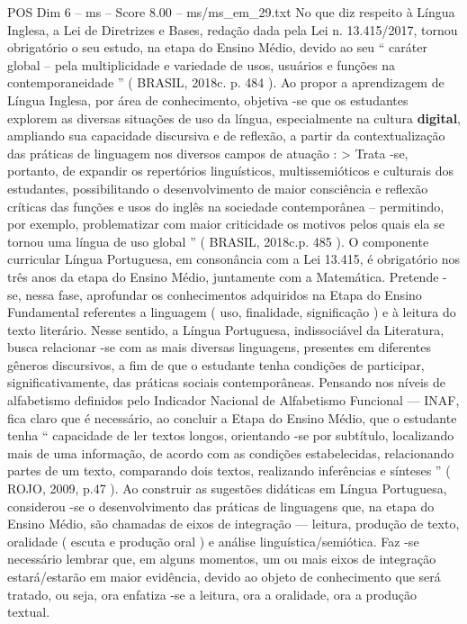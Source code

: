 \begin{textsample}{POS Dim 6 – ms – Score 8.00 – ms/ms\_em\_29.txt}
No que diz respeito à Língua Inglesa, a Lei de Diretrizes e Bases, redação dada pela Lei n. 13.415/2017, tornou obrigatório o seu estudo, na etapa do Ensino Médio, devido ao seu “ caráter global – pela multiplicidade e variedade de usos, usuários e funções na contemporaneidade ” ( BRASIL, 2018c. p. 484 ).
Ao propor a aprendizagem de Língua Inglesa, por área de conhecimento, objetiva -se que os estudantes explorem as diversas situações de uso da língua, especialmente na cultura \textbf{digital}, ampliando sua capacidade discursiva e de reflexão, a partir da contextualização das práticas de linguagem nos diversos campos de atuação : > Trata -se, portanto, de expandir os repertórios linguísticos, multissemióticos e culturais dos estudantes, possibilitando o desenvolvimento de maior consciência e reflexão críticas das funções e usos do inglês na sociedade contemporânea – permitindo, por exemplo, problematizar com maior criticidade os motivos pelos quais ela se tornou uma língua de uso global ” ( BRASIL, 2018c.p. 485 ).
O componente curricular Língua Portuguesa, em consonância com a Lei 13.415, é obrigatório nos três anos da etapa do Ensino Médio, juntamente com a Matemática.
Pretende -se, nessa fase, aprofundar os conhecimentos adquiridos na Etapa do Ensino Fundamental referentes a linguagem ( uso, finalidade, significação ) e à leitura do texto literário.
Nesse sentido, a Língua Portuguesa, indissociável da Literatura, busca relacionar -se com as mais diversas linguagens, presentes em diferentes gêneros discursivos, a fim de que o estudante tenha condições de participar, significativamente, das práticas sociais contemporâneas.
Pensando nos níveis de alfabetismo definidos pelo Indicador Nacional de Alfabetismo Funcional — INAF, fica claro que é necessário, ao concluir a Etapa do Ensino Médio, que o estudante tenha “ capacidade de ler textos longos, orientando -se por subtítulo, localizando mais de uma informação, de acordo com as condições estabelecidas, relacionando partes de um texto, comparando dois textos, realizando inferências e sínteses ” ( ROJO, 2009, p.47 ).
Ao construir as sugestões didáticas em Língua Portuguesa, considerou -se o desenvolvimento das práticas de linguagens que, na etapa do Ensino Médio, são chamadas de eixos de integração — leitura, produção de texto, oralidade ( escuta e produção oral ) e análise linguística/semiótica.
Faz -se necessário lembrar que, em alguns momentos, um ou mais eixos de integração estará/estarão em maior evidência, devido ao objeto de conhecimento que será tratado, ou seja, ora enfatiza -se a leitura, ora a oralidade, ora a produção textual.

\end{textsample}
